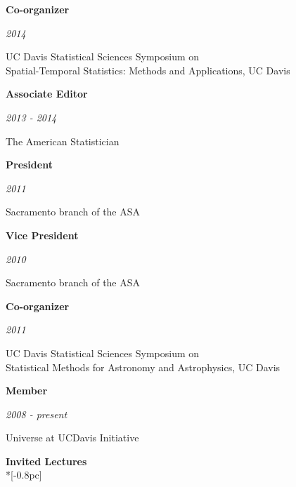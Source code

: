 \documentclass[11pt]{article}
\newcommand{\head}[1]{
  \vspace{10pt}
  {\Large \bf #1} \\*[-0.8pc]
  \underline{\hspace{6.07in}}}
\newcommand{\datedentry}[2]{
  \vspace{5pt}
  \begin{minipage}{5in}{\textbf{#1}}\end{minipage}
  \hfill
  \begin{minipage}{1in}{\hfill\textit{#2}}\end{minipage}
  }
\begin{document}
\datedentry{Co-organizer}{2014}
UC Davis Statistical Sciences Symposium on \\
Spatial-Temporal Statistics: Methods and Applications, UC Davis

\vspace{7pt}

\datedentry{Associate Editor}{2013 - 2014}
The American Statistician

\vspace{7pt}

\datedentry{President}{2011}
Sacramento branch of the ASA

\vspace{7pt}

\datedentry{Vice President}{2010}
Sacramento branch of the ASA

\vspace{7pt}

\datedentry{Co-organizer}{2011}
UC Davis Statistical Sciences Symposium on \\
Statistical Methods for Astronomy and Astrophysics, UC Davis

\vspace{7pt}

\datedentry{Member}{2008 - present}
Universe at UCDavis Initiative


\vspace{5pt}
\head{Invited Lectures}
\end{document}
